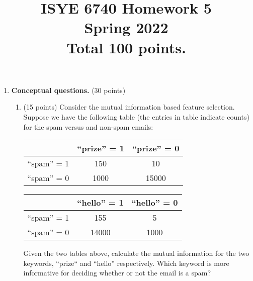 \documentclass[twoside,10pt]{article}
\begin{document}
\title{ISYE 6740 Homework 5\\ 
Spring 2022\\ 
\small Total 100 points.}
\date{}
\maketitle






\begin{enumerate}

\item {\bf Conceptual questions.} (30 points) 

\begin{enumerate}

\item (15 points) Consider the mutual information based feature selection. Suppose we have the following table (the entries in table indicate counts) for the spam versus and non-spam emails:
%
\begin{center}
\begin{tabular}{c|c|c}
\hline
& ``prize'' = 1 & ``prize'' = 0 \\\hline
``spam'' = 1 & 150& 10 \\ \hline 
 ``spam'' = 0 & 1000 & 15000  \\\hline
\end{tabular}
\end{center}

\begin{center}
\begin{tabular}{c|c|c}
\hline
& ``hello'' = 1 & ``hello'' = 0 \\\hline
``spam'' = 1 & 155 & 5 \\ \hline 
 ``spam'' = 0 & 14000 & 1000  \\\hline
\end{tabular}
\end{center}

Given the two tables above, calculate the mutual information for the two keywords, ``prize`` and ``hello'' respectively. Which keyword is more informative for deciding whether or not the email is a spam?


\end{enumerate}
\end{enumerate}
\end{document}
